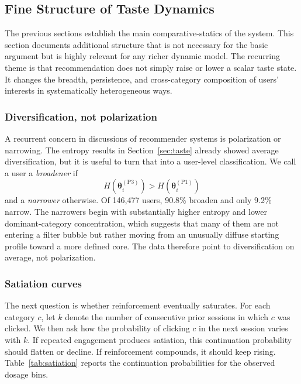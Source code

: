 \documentclass[11pt]{article}
\begin{document}
\subsection{Fine Structure of Taste Dynamics}
\label{sec:fine}

The previous sections establish the main comparative-statics of the system. This section documents additional structure that is not necessary for the basic argument but is highly relevant for any richer dynamic model. The recurring theme is that recommendation does not simply raise or lower a scalar taste state. It changes the breadth, persistence, and cross-category composition of users' interests in systematically heterogeneous ways.

\subsubsection{Diversification, not polarization}

A recurrent concern in discussions of recommender systems is polarization or narrowing. The entropy results in Section~\ref{sec:taste} already showed average diversification, but it is useful to turn that into a user-level classification. We call a user a \emph{broadener} if
\[
H\!\left(\boldsymbol{\theta}_i^{(\mathrm{P3})}\right)
>
H\!\left(\boldsymbol{\theta}_i^{(\mathrm{P1})}\right)
\]
and a \emph{narrower} otherwise. Of 146,477 users, 90.8\% broaden and only 9.2\% narrow. The narrowers begin with substantially higher entropy and lower dominant-category concentration, which suggests that many of them are not entering a filter bubble but rather moving from an unusually diffuse starting profile toward a more defined core. The data therefore point to diversification on average, not polarization.

\subsubsection{Satiation curves}

The next question is whether reinforcement eventually saturates. For each category $c$, let $k$ denote the number of consecutive prior sessions in which $c$ was clicked. We then ask how the probability of clicking $c$ in the next session varies with $k$. If repeated engagement produces satiation, this continuation probability should flatten or decline. If reinforcement compounds, it should keep rising. Table~\ref{tab:satiation} reports the continuation probabilities for the observed dosage bins.
\end{document}
